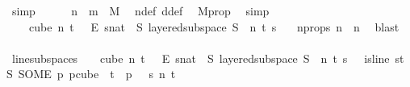 \begin{isabellebody}
\ simp\isanewline
\ \ \ \ \isamarkupfalse%
\ {\isachardoublequoteopen}n\ {\isacharplus}{\kern0pt}\ m\ {\isacharequal}{\kern0pt}\ M{\isacharprime}{\kern0pt}{\isachardoublequoteclose}\ \isamarkupfalse%
\ n{\isacharunderscore}{\kern0pt}def\ d{\isacharunderscore}{\kern0pt}def\ \isamarkupfalse%
\ M{\isacharprime}{\kern0pt}{\isacharunderscore}{\kern0pt}prop\ \isamarkupfalse%
\ simp\isanewline
\ \ \ \ \isamarkupfalse%
\ {\isachardoublequoteopen}{\isasymforall}{\isasymchi}{\isachardot}{\kern0pt}\ {\isasymchi}\ {\isasymin}\ {\isacharparenleft}{\kern0pt}cube\ n\ {\isacharparenleft}{\kern0pt}t\ {\isacharplus}{\kern0pt}\ {}{\isacharparenright}{\kern0pt}{\isacharparenright}{\kern0pt}\ {\isasymrightarrow}\isactrlsub E\ {\isacharbraceleft}{\kern0pt}{\isachardot}{\kern0pt}{\isachardot}{\kern0pt}{\isacharless}{\kern0pt}s{\isacharcolon}{\kern0pt}{\isacharcolon}{\kern0pt}nat{\isacharbraceright}{\kern0pt}\ {\isasymlongrightarrow}\ {\isacharparenleft}{\kern0pt}{\isasymexists}S{\isachardot}{\kern0pt}\ layered{\isacharunderscore}{\kern0pt}subspace\ S\ {}\ n\ t\ s\ {\isasymchi}{\isacharparenright}{\kern0pt}{\isachardoublequoteclose}\ \isamarkupfalse%
\ n{\isacharprime}{\kern0pt}{\isacharunderscore}{\kern0pt}props\ {\isacartoucheopen}n\ {\isasymge}\ n{\isacharprime}{\kern0pt}{\isacartoucheclose}\ \isamarkupfalse%
\ blast\isanewline
\ \ \ \ \isamarkupfalse%
\ line{\isacharunderscore}{\kern0pt}subspace{\isacharunderscore}{\kern0pt}s{\isacharcolon}{\kern0pt}\ {\isachardoublequoteopen}{\isasymforall}{\isasymchi}{\isachardot}{\kern0pt}\ {\isasymchi}\ {\isasymin}\ {\isacharparenleft}{\kern0pt}cube\ n\ {\isacharparenleft}{\kern0pt}t\ {\isacharplus}{\kern0pt}\ {}{\isacharparenright}{\kern0pt}{\isacharparenright}{\kern0pt}\ {\isasymrightarrow}\isactrlsub E\ {\isacharbraceleft}{\kern0pt}{\isachardot}{\kern0pt}{\isachardot}{\kern0pt}{\isacharless}{\kern0pt}s{\isacharcolon}{\kern0pt}{\isacharcolon}{\kern0pt}nat{\isacharbraceright}{\kern0pt}\ {\isasymlongrightarrow}\ {\isacharparenleft}{\kern0pt}{\isasymexists}S{\isachardot}{\kern0pt}\ layered{\isacharunderscore}{\kern0pt}subspace\ S\ {}\ n\ t\ s\ {\isasymchi}\ {\isasymand}\ is{\isacharunderscore}{\kern0pt}line\ {\isacharparenleft}{\kern0pt}{\isasymlambda}s{\isasymin}{\isacharbraceleft}{\kern0pt}{\isachardot}{\kern0pt}{\isachardot}{\kern0pt}{\isacharless}{\kern0pt}t{\isacharplus}{\kern0pt}{}{\isacharbraceright}{\kern0pt}{\isachardot}{\kern0pt}\ S\ {\isacharparenleft}{\kern0pt}SOME\ p{\isachardot}{\kern0pt}\ p{\isasymin}cube\ {}\ {\isacharparenleft}{\kern0pt}t{\isacharplus}{\kern0pt}{}{\isacharparenright}{\kern0pt}\ {\isasymand}\ p\ {}\ {\isacharequal}{\kern0pt}\ s{\isacharparenright}{\kern0pt}{\isacharparenright}{\kern0pt}\ n\ {\isacharparenleft}{\kern0pt}t{\isacharplus}{\kern0pt}{}{\isacharparenright}{\kern0pt}{\isacharparenright}{\kern0pt}{\isachardoublequoteclose}\isanewline

\end{isabellebody}
